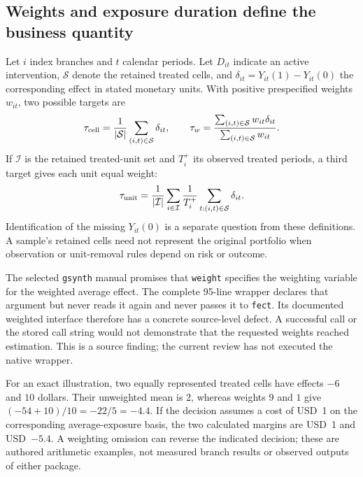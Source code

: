 \subsection{Weights and exposure duration define the business quantity}
\label{exec21:gsynth-target}

Let $i$ index branches and $t$ calendar periods. Let $D_{it}$ indicate an
active intervention, $\mathcal S$ denote the retained treated cells, and
$\delta_{it}=Y_{it}(1)-Y_{it}(0)$ the corresponding effect in stated monetary
units. With positive prespecified weights $w_{it}$, two possible targets are
\begin{equation}
\label{exec21:gsynth-weights}
 \tau_{\rm cell}=\frac{1}{|\mathcal S|}\sum_{(i,t)\in\mathcal S}\delta_{it},
 \qquad
 \tau_w=\frac{\sum_{(i,t)\in\mathcal S}w_{it}\delta_{it}}
                  {\sum_{(i,t)\in\mathcal S}w_{it}}.
\end{equation}
If $\mathcal I$ is the retained treated-unit set and $T_i^+$ its observed
treated periods, a third target gives each unit equal weight:
\begin{equation}
\label{exec21:gsynth-units}
 \tau_{\rm unit}=\frac{1}{|\mathcal I|}\sum_{i\in\mathcal I}
       \frac{1}{T_i^+}\sum_{t:(i,t)\in\mathcal S}\delta_{it}.
\end{equation}
Identification of the missing $Y_{it}(0)$ is a separate question from these
definitions. A sample's retained cells need not represent the original
portfolio when observation or unit-removal rules depend on risk or outcome.

The selected \texttt{gsynth} manual promises that \texttt{weight} specifies
the weighting variable for the weighted average effect. The complete
95-line wrapper declares that argument but never reads it again and never
passes it to \texttt{fect}. Its documented weighted interface therefore has
a concrete source-level defect. A successful call or the stored call string
would not demonstrate that the requested weights reached estimation.
This is a source finding; the current review has not executed the native
wrapper. \citep{exec21_gsynth_wrapper}

For an exact illustration, two equally represented treated cells have effects
$-6$ and $10$ dollars. Their unweighted mean is $2$, whereas weights $9$ and
$1$ give $(-54+10)/10=-22/5=-4.4$. If the decision assumes a cost of USD~1
on the corresponding average-exposure basis, the two calculated margins are
USD~1 and USD~$-5.4$. A weighting omission can reverse the indicated decision;
these are authored arithmetic examples, not measured branch results or
observed outputs of either package. \citep{exec21_gsynth_reference}

